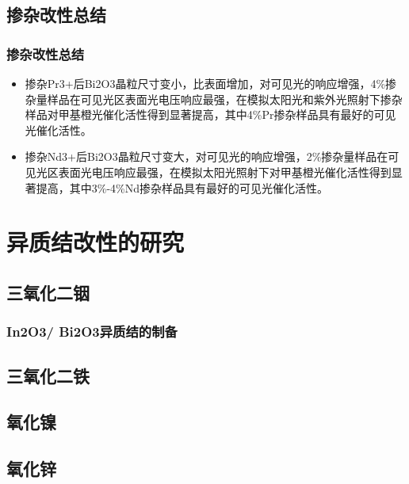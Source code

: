 \documentclass[xetex,compress]{mybeamer}
\begin{document}
\subsection{掺杂改性总结}
\begin{frame}
\frametitle{掺杂改性总结}
\begin{block}{}
\begin{itemize}
\item<1> 掺杂Pr3+后Bi2O3晶粒尺寸变小，比表面增加，对可见光的响应增强，4\%掺杂量样品在可见光区表面光电压响应最强，在模拟太阳光和紫外光照射下掺杂样品对甲基橙光催化活性得到显著提高，其中4\%Pr掺杂样品具有最好的可见光催化活性。%
\item<2> 掺杂Nd3+后Bi2O3晶粒尺寸变大，对可见光的响应增强，2\%掺杂量样品在可见光区表面光电压响应最强，在模拟太阳光照射下对甲基橙光催化活性得到显著提高，其中3\%-4\%Nd掺杂样品具有最好的可见光催化活性。
\end{itemize}
\end{block}
\end{frame}


\section{异质结改性的研究}
\subsection{三氧化二铟}
\begin{frame}
\frametitle{In2O3/ Bi2O3异质结的制备}

\end{frame}


\subsection{三氧化二铁}

\subsection{氧化镍}

\subsection{氧化锌}
\end{document}

